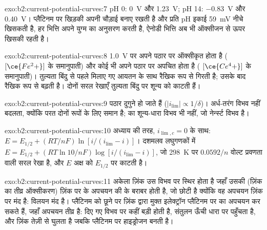 \begin{solution}{exo:b2:current-potential-curves:7}
pH 0: \qty{0}{V} और \qty{1.23}{V}; pH 14: \qty{-0.83}{V} और \qty{0.40}{V}। प्लैटिनम
पर खिड़की अपनी चौड़ाई बनाए रखती है और प्रति pH इकाई \qty{59}{mV} नीचे खिसकती है,
हर भित्ति अपने युग्म का अनुसरण करती है, ऐनोडी भित्ति अब भी ऑक्सीजन
 से ऊपर खिसकी रहती है।
\end{solution}

\begin{solution}{exo:b2:current-potential-curves:8}
\qty{1.0}{V} पर  अपने पठार पर ऑक्सीकृत होता है (
$[\ce{Fe^2+}]$ के समानुपाती) और कोई भी  अपने पठार पर अपचित होता है
( $[\ce{Ce^4+}]$ के समानुपाती)। तुल्यता बिंदु से पहले
 मिलाए गए आयतन के साथ रैखिक रूप से गिरती है; उसके बाद  रैखिक रूप से बढ़ती है। दोनों सरल रेखाएँ तुल्यता बिंदु पर शून्य को काटती हैं।
\end{solution}

\begin{solution}{exo:b2:current-potential-curves:9}
पठार दुगुने हो जाते हैं ($|i_{\lim}| \propto 1/\delta$)। अर्ध-तरंग विभव
नहीं बदलता, क्योंकि परत दोनों रूपों के लिए समान है;  का शून्य-धारा
विभव भी नहीं, जो नेर्न्स्ट विभव है।
\end{solution}

\begin{solution}{exo:b2:current-potential-curves:10}
अध्याय की तरह, $i_{\lim,c} = 0$ के साथ: $E = E_{1/2} + (RT/nF)\ln[i/(i_{\lim} -
i)]$। दशमलव लघुगणकों में $E = E_{1/2} + (RT\ln 10/nF)\log[i/(i_{\lim} - i)]$,
जो \qty{298}{K} पर $0.0592/n$ वोल्ट प्रवणता वाली सरल रेखा है, और
$E$ अक्ष को $E_{1/2}$ पर काटती है।
\end{solution}

\begin{solution}{exo:b2:current-potential-curves:11}
अकेला ज़िंक उस विभव पर स्थिर होता है जहाँ उसकी  (ज़िंक का तीव्र
ऑक्सीकरण) ज़िंक पर  के अपचयन की  के बराबर होती है,
जो छोटी है क्योंकि वह अपचयन ज़िंक पर मंद है: विलयन
मंद है। प्लैटिनम को छूने पर ज़िंक द्वारा मुक्त इलेक्ट्रॉन प्लैटिनम पर  का
अपचयन कर सकते हैं, जहाँ अपचयन तीव्र है: दिए गए विभव पर 
कहीं बड़ी होती है, संतुलन ऊँची धारा पर पहुँचता है, और
ज़िंक तेज़ी से घुलता है जबकि प्लैटिनम पर हाइड्रोजन बनती है।
\end{solution}

